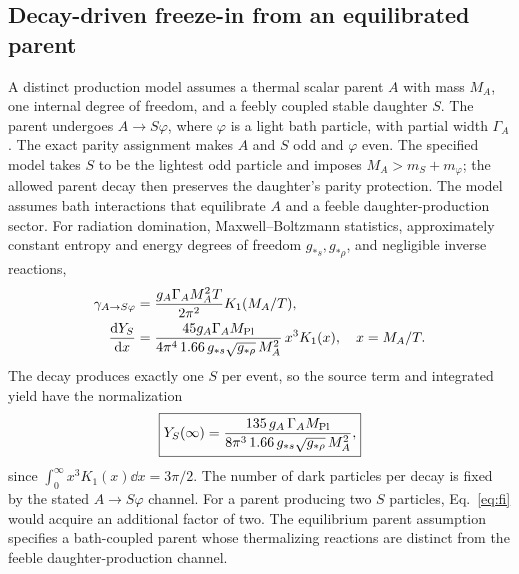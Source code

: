 \subsection{Decay-driven freeze-in from an equilibrated parent}\label{sec:decay-freezein}
A distinct production model assumes a thermal scalar parent $A$ with mass $M_A$, one internal degree of freedom, and a feebly coupled stable daughter $S$. The parent undergoes $A\to S\varphi$, where $\varphi$ is a light bath particle, with partial width $\Gamma_A$. The exact parity assignment makes $A$ and $S$ odd and $\varphi$ even. The specified model takes $S$ to be the lightest odd particle and imposes $M_A>m_S+m_\varphi$; the allowed parent decay then preserves the daughter's parity protection. The model assumes bath interactions that equilibrate $A$ and a feeble daughter-production sector. For radiation domination, Maxwell--Boltzmann statistics, approximately constant entropy and energy degrees of freedom $g_{*s},g_{*\rho}$, and negligible inverse reactions,
\begin{align}
\gamma_{A\to S\varphi}&=\frac{g_A\Gamma_A M_A^2 T}{2\pi^2}K_1(M_A/T),\\
\frac{\mathrm{d} Y_S}{\mathrm{d} x}&=\frac{45g_A\Gamma_AM_{\rm Pl}}{4\pi^4\,1.66\,g_{*s}\sqrt{g_{*\rho}}\,M_A^2}
\,x^3K_1(x),\quad x=M_A/T.\label{eq:fimain}
\end{align}
The decay produces exactly one $S$ per event, so the source term and integrated yield have the normalization
\begin{equation}\label{eq:fi}
\boxed{Y_S(\infty)=\frac{135\,g_A\,\Gamma_AM_{\rm Pl}}
{8\pi^3\,1.66\,g_{*s}\sqrt{g_{*\rho}}\,M_A^2},}
\end{equation}
since $\int_0^\infty x^3K_1(x)\dd x=3\pi/2$. The number of dark particles per decay is fixed by the stated $A\to S\varphi$ channel. For a parent producing two $S$ particles, Eq.~\eqref{eq:fi} would acquire an additional factor of two. The equilibrium parent assumption specifies a bath-coupled parent whose thermalizing reactions are distinct from the feeble daughter-production channel.

